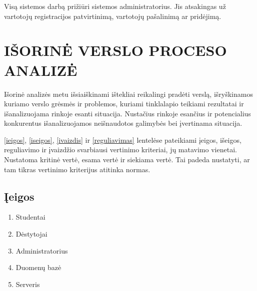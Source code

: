 \documentclass{VUMIFPSkursinis}
\begin{document}
Visą sistemos darbą prižiūri sistemos administratorius. Jis atsakingas už vartotojų registracijos patvirtinimą, vartotojų pašalinimą ar pridėjimą.

\newpage
\section{IŠORINĖ VERSLO PROCESO ANALIZĖ}
Išorinė analizės metu išsiaiškinami ištekliai
reikalingi pradėti verslą, išryškinamos kuriamo verslo grėsmės ir
problemos, kuriami tinklalapio teikiami rezultatai ir išanalizuojama rinkoje esanti situacija. Nustačius rinkoje esančius ir potencialius konkurentus išanalizuojamos
neišnaudotos galimybės bei įvertinama situacija.

\ref{ieigos}, \ref{iseigos}, \ref{ivaizdis} ir \ref{reguliavimas} lentelėse pateikiami įeigos, išeigos, reguliavimo ir įvaizdžio svarbiausi vertinimo kriteriai,
jų matavimo vienetai. Nustatoma kritinė vertė, esama vertė ir siekiama vertė. Tai padeda
nustatyti, ar tam tikras vertinimo kriterijus atitinka normas.
\subsection{Įeigos}
\begin{enumerate}
	\item Studentai
	\item Dėstytojai
	\item Administratorius
	\item Duomenų bazė
	\item Serveris
\end{enumerate}
\begin{table}[H]
	\centering
	\caption{Įeigos}
	\label{ieigos}
\end{table}
\end{document}
